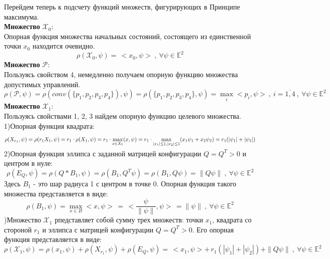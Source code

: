 \documentclass[10pt]{article}
\begin{document}
Перейдем теперь к подсчету функций множеств, фигурирующих в Принципе максимума.\medskip\\
\textbf{Множество} \( \mathcal{X}_0\):\smallskip\\
Опорная функция множества начальных состояний, состоящего из единственной точки \(x_0\) находится очевидно.
\[ \rho(\mathcal{X}_0, \psi) = \, <x_0, \psi> \ , \ \forall \psi \in \mathbb{E}^2\] 
\textbf{Множество} \( \mathcal{P}\):\smallskip\\
Пользуясь свойством 4, немедленно получаем опорную функцию множества допустимых управлений.
\[ \rho(\mathcal{P}, \psi) = \rho(conv(\{p_1, p_2, p_3, p_4\}), \psi) = \rho(\{p_1, p_2, p_3, p_4\}, \psi) = \max\limits_{i} <p_i, \psi> \ ,\ i = \overline{1, 4} \ , \ \forall \psi \in \mathbb{E}^2\] 
\textbf{Множество} \( \mathcal{X}_1\):\smallskip\\
Пользуясь свойствами 1, 2, 3 найдем опорную функцию целевого множества.\medskip\\
1)Опорная функция квадрата: 
\[ \rho (X_{r_1},\psi) = \rho(r_1 X_1, \psi) = r_1 \cdot \rho(X_1, \psi) = r_1 \cdot  \smash{\displaystyle\max_{x \in X_1}} ( x, \psi) = r_1 \cdot \smash{\displaystyle\max_{|x_1| \leq 1, |x_2| \leq 1}}(x_1 \psi_1 + x_2 \psi_2) =  r_1(|\psi_1| + |\psi_2|) \bigskip\]
2)Опорная функция эллипса с заданной матрицей конфигурации \(Q = Q^T > 0\) и центром в нуле:
\[ \rho(E_Q, \psi) = \rho(Q * B_1, \psi) = \rho(B_1, Q^T \psi) = \rho(B_1, Q\psi) = \|Q\psi\| \ , \ \forall \psi \in \mathbb{E}^2 \]
Здесь \( B_1 \) - это шар радиуса 1 с центром в точке 0. Опорная функция такого множества представляется в виде:
\[ \rho(B_1, \psi) = \max\limits_{x \in B} <x, \psi> \, = \, < \frac{\psi}{ \| \psi \| }, \psi> \, = \| \psi \| \ , \ \forall \psi \in \mathbb{E}^2\]
\newpage
{})Множество \( \mathcal{X}_1\) рпедставляет собой сумму трех множеств: точки \( x_1\), квадрата со стороной \(r_1\) и эллипса с матрицей конфигурации \( Q = Q^T > 0\). Его опорная функция представляется в виде:
\[ \rho(\mathcal{X}_1, \psi) = \rho(x_1, \psi) + \rho(X_{r_1}, \psi) + \rho(E_Q, \psi) = \, <x_1, \psi> + \, r_1 (|\psi_1| + |\psi_2|) + \|Q\psi\| \ , \ \forall \psi \in \mathbb{E}^2\]
\end{document}
